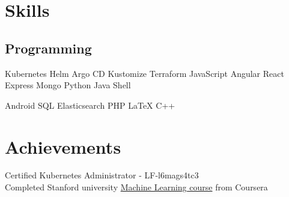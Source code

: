 \documentclass[]{font}
\begin{document}
%
%
\lastupdated

%
%

%
%

\begin{minipage}[t]{0.33\textwidth} 


\section{Skills}
\subsection{Programming}
Kubernetes \textbullet{} 
Helm \textbullet{} 
Argo CD \textbullet{} 
Kustomize \textbullet{} 
Terraform \textbullet{} 
JavaScript \textbullet{} 
Angular \textbullet{} 
React \textbullet{}
Express \textbullet{}  
Mongo \textbullet{} 
Python \textbullet{}
Java \textbullet{} 
Shell \textbullet{} 

Android \textbullet{} 
SQL \textbullet{} 
Elasticsearch \textbullet{}
PHP \textbullet{}
\LaTeX \textbullet{} 
C++ \textbullet{}
\sectionsep



\section{Achievements} 
\vspace{\topsep}
\textbullet{} Certified Kubernetes Administrator - LF-l6mags4tc3 \\
\textbullet{} Completed Stanford university \href{https://www.coursera.org/account/accomplishments/records/EJQWCKEBUSBD}{Machine Learning course} from Coursera \\
\sectionsep


\end{minipage}
\end{document}
